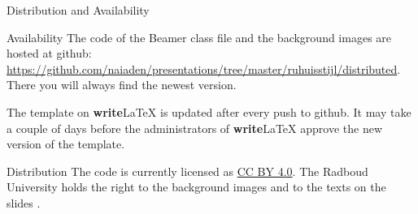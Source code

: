 \documentclass[department=none, notes={show notes}, slidesperpage=4, official=true, handout]{beamerruhuisstijl}
\begin{document}
\begin{frame}{Distribution and Availability}
	\begin{block}{Availability}
    	The code of the Beamer class file and the background images are hosted at github: \url{https://github.com/naiaden/presentations/tree/master/ruhuisstijl/distributed}. There you will always find the newest version. 
        
        The template on \textbf{write}\LaTeX{} is updated after every push to github. It may take a couple of days before the administrators of \textbf{write}\LaTeX{} approve the new version of the template.
    \end{block} 

    \begin{block}{Distribution}
    	The code is currently licensed as \href{https://creativecommons.org/licenses/by/4.0/}{CC BY 4.0}. The Radboud University holds the right to the background images and to the texts on the slides .
    \end{block}
\end{frame}
\end{document}
